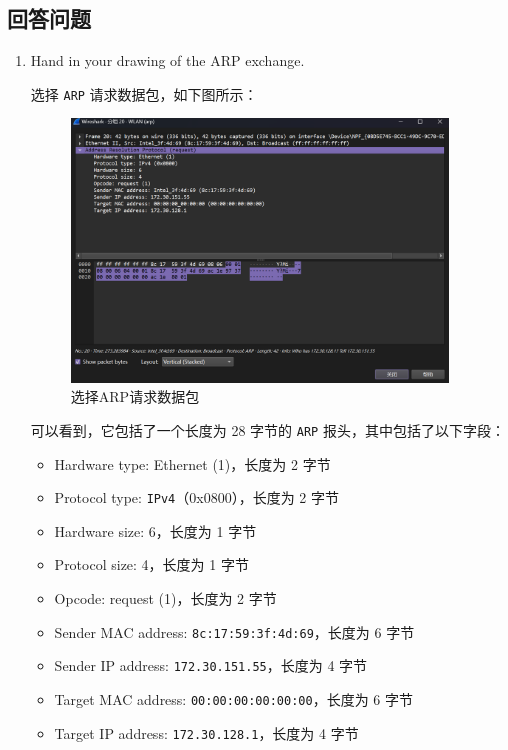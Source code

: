 \documentclass{article}
\begin{document}
	\subsection{回答问题}
	
	\begin{enumerate}
		\item Hand in your drawing of the ARP exchange.
		
		选择 \texttt{ARP} 请求数据包，如下图所示：
		
		\begin{figure}[H]
			\centering
			\includegraphics[width=10cm]{images/6.选择ARP请求数据包.png}
			\caption{选择ARP请求数据包}
		\end{figure}
		
		可以看到，它包括了一个长度为 28 字节的 \texttt{ARP} 报头，其中包括了以下字段：
		
		\begin{itemize}[noitemsep]
			\item Hardware type: Ethernet (1)，长度为 2 字节
			\item Protocol type: \texttt{IPv4}（0x0800），长度为 2 字节
			\item Hardware size: 6，长度为 1 字节
			\item Protocol size: 4，长度为 1 字节
			\item Opcode: request (1)，长度为 2 字节
			\item Sender MAC address: \texttt{8c:17:59:3f:4d:69}，长度为 6 字节
			\item Sender IP address: \texttt{172.30.151.55}，长度为 4 字节
			\item Target MAC address: \texttt{00:00:00:00:00:00}，长度为 6 字节
			\item Target IP address: \texttt{172.30.128.1}，长度为 4 字节
		\end{itemize}
		

\end{enumerate}
\end{document}
